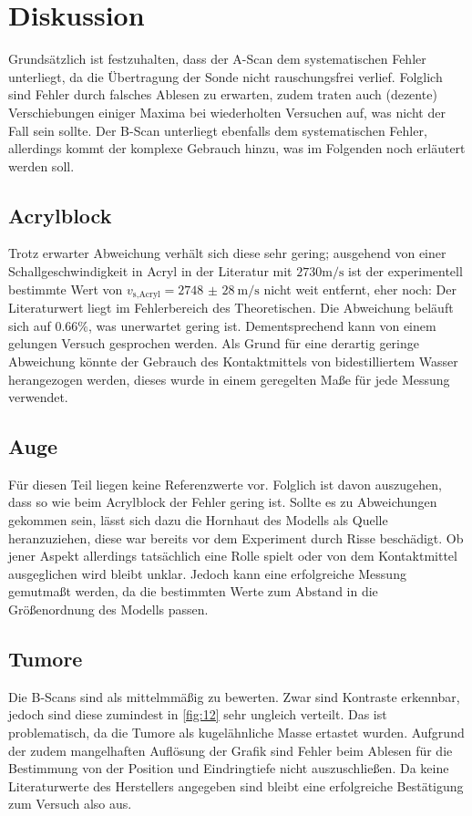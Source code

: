 \section{Diskussion}
\label{sec:Diskussion}

Grundsätzlich ist festzuhalten, dass der A-Scan dem systematischen Fehler 
unterliegt, da die Übertragung der Sonde nicht rauschungsfrei verlief. Folglich 
sind Fehler durch falsches Ablesen zu erwarten, zudem traten auch (dezente) 
Verschiebungen einiger Maxima bei wiederholten Versuchen auf, was nicht der 
Fall sein sollte. Der B-Scan unterliegt ebenfalls dem systematischen Fehler, 
allerdings kommt der komplexe Gebrauch hinzu, was im Folgenden noch erläutert 
werden soll.

\subsection{Acrylblock}
Trotz erwarter Abweichung verhält sich diese sehr gering; ausgehend von einer 
Schallgeschwindigkeit in Acryl in der Literatur mit $2730 \unit{\meter}/\unit{\second}$
\cite{acryl} ist der experimentell bestimmte Wert von $v_\text{s,Acryl} =
\qty{2748(28)}{\meter\per\second}$ nicht weit entfernt, eher noch:
Der Literaturwert liegt im Fehlerbereich des Theoretischen. Die Abweichung 
beläuft sich auf $0.66 \%$, was unerwartet gering ist. Dementsprechend kann 
von einem gelungen Versuch gesprochen werden. Als Grund für eine derartig geringe 
Abweichung könnte der Gebrauch des Kontaktmittels von bidestilliertem Wasser 
herangezogen werden, dieses wurde in einem geregelten Maße für jede Messung 
verwendet.

\subsection{Auge}
Für diesen Teil liegen keine Referenzwerte vor. Folglich ist davon auszugehen, 
dass so wie beim Acrylblock der Fehler gering ist. Sollte es zu Abweichungen 
gekommen sein, lässt sich dazu die Hornhaut des Modells als Quelle heranzuziehen, 
diese war bereits vor dem Experiment durch Risse beschädigt. Ob jener Aspekt 
allerdings tatsächlich eine Rolle spielt oder von dem Kontaktmittel ausgeglichen 
wird bleibt unklar. Jedoch kann eine erfolgreiche Messung gemutmaßt werden, da
die bestimmten Werte zum Abstand in die Größenordnung des Modells passen.

\subsection{Tumore}
Die B-Scans sind als mittelmmäßig zu bewerten. Zwar sind Kontraste erkennbar, 
jedoch sind diese zumindest in \autoref{fig:12} sehr ungleich verteilt. Das 
ist problematisch, da die Tumore als kugelähnliche Masse ertastet wurden. 
Aufgrund der zudem mangelhaften Auflösung der Grafik sind Fehler beim Ablesen 
für die Bestimmung von der Position und Eindringtiefe nicht auszuschließen. 
Da keine Literaturwerte des Herstellers angegeben sind bleibt eine erfolgreiche 
Bestätigung zum Versuch also aus.

